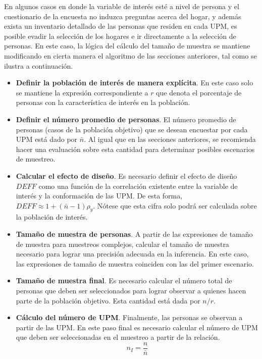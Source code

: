 \documentclass[
  12pt,
  spanish,
]{book}
\begin{document}
En algunos casos en donde la variable de interés esté a nivel de persona y el cuestionario de la encuesta no induzca preguntas acerca del hogar, y además exista un inventario detallado de las personas que residen en cada UPM, es posible evadir la selección de los hogares e ir directamente a la selección de personas. En este caso, la lógica del cálculo del tamaño de muestra se mantiene modificando en cierta manera el algoritmo de las secciones anteriores, tal como se ilustra a continuación.

\begin{itemize}
\item
  \textbf{Definir la población de interés de manera explícita}. En este caso solo se mantiene la expresión correspondiente a \(r\) que denota el porcentaje de personas con la característica de interés en la población.
\item
  \textbf{Definir el número promedio de personas}. El número promedio de personas (casos de la población objetivo) que se desean encuestar por cada UPM está dado por \(\bar{n}\). Al igual que en las secciones anteriores, se recomienda hacer una evaluación sobre esta cantidad para determinar posibles escenarios de muestreo.
\item
  \textbf{Calcular el efecto de diseño}. Es necesario definir el efecto de diseño \(DEFF\) como una función de la correlación existente entre la variable de interés y la conformación de las UPM. De esta forma, \(DEFF \approx 1 + (\bar{n} - 1)\rho_y\). Nótese que esta cifra solo podrá ser calculada sobre la población de interés.
\item
  \textbf{Tamaño de muestra de personas}. A partir de las expresiones de tamaño de muestra para muestreos complejos, calcular el tamaño de muestra necesario para lograr una precisión adecuada en la inferencia. En este caso, las expresiones de tamaño de muestra coinciden con las del primer escenario.
\item
  \textbf{Tamaño de muestra final}. Es necesario calcular el número total de personas que deben ser seleccionados para lograr observar a quienes hacen parte de la población objetivo. Esta cantidad está dada por \(n / r\).
\item
  \textbf{Cálculo del número de UPM}. Finalmente, las personas se observan a partir de las UPM. En este paso final es necesario calcular el número de UPM que deben ser seleccionadas en el muestreo a partir de la relación.
  \[
  n_{I} = \frac{n}{\bar{n}} 
  \]
\end{itemize}
\end{document}
